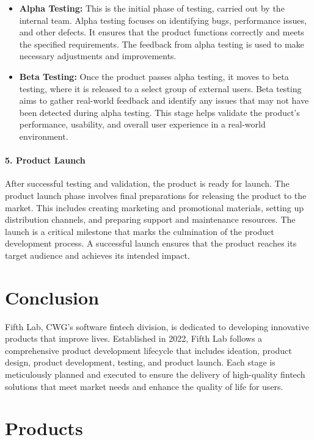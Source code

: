 \documentclass[a4paper,12pt]{report}
\begin{document}
	\begin{itemize}
		\item \textbf{Alpha Testing:} This is the initial phase of testing, carried out by the internal team. Alpha testing focuses on identifying bugs, performance issues, and other defects. It ensures that the product functions correctly and meets the specified requirements. The feedback from alpha testing is used to make necessary adjustments and improvements.
		\item \textbf{Beta Testing:} Once the product passes alpha testing, it moves to beta testing, where it is released to a select group of external users. Beta testing aims to gather real-world feedback and identify any issues that may not have been detected during alpha testing. This stage helps validate the product’s performance, usability, and overall user experience in a real-world environment.
	\end{itemize}
	
	\paragraph{5. Product Launch}
	After successful testing and validation, the product is ready for launch. The product launch phase involves final preparations for releasing the product to the market. This includes creating marketing and promotional materials, setting up distribution channels, and preparing support and maintenance resources. The launch is a critical milestone that marks the culmination of the product development process. A successful launch ensures that the product reaches its target audience and achieves its intended impact.
	
	\section{Conclusion}
	Fifth Lab, CWG’s software fintech division, is dedicated to developing innovative products that improve lives. Established in 2022, Fifth Lab follows a comprehensive product development lifecycle that includes ideation, product design, product development, testing, and product launch. Each stage is meticulously planned and executed to ensure the delivery of high-quality fintech solutions that meet market needs and enhance the quality of life for users.
	
		
	\newpage
	\section{Products}
	
\end{document}
